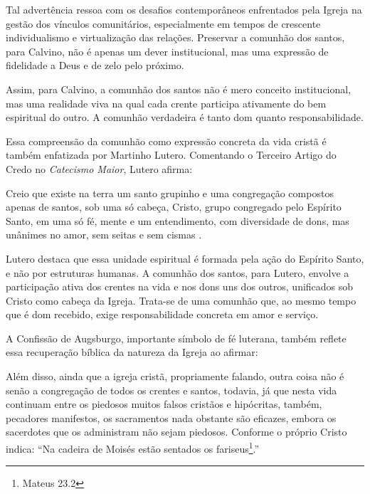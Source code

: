 Tal advertência ressoa com os desafios contemporâneos enfrentados pela Igreja na gestão dos vínculos comunitários, especialmente em tempos de crescente individualismo e virtualização das relações. Preservar a comunhão dos santos, para Calvino, não é apenas um dever institucional, mas uma expressão de fidelidade a Deus e de zelo pelo próximo.

Assim, para Calvino, a comunhão dos santos não é mero conceito institucional, mas uma realidade viva na qual cada crente participa ativamente do bem espiritual do outro. A comunhão verdadeira é tanto dom quanto responsabilidade.

Essa compreensão da comunhão como expressão concreta da vida cristã é também enfatizada por Martinho Lutero. Comentando o Terceiro Artigo do Credo no \textit{Catecismo Maior}, Lutero afirma:

\begin{citacao}
    Creio que existe na terra um santo grupinho e uma congregação compostos apenas de santos, sob uma só cabeça, Cristo, grupo congregado pelo Espírito Santo, em uma só fé, mente e um entendimento, com diversidade de dons, mas unânimes no amor, sem seitas e sem cismas \cite[p.~454]{livroConcordia}.
\end{citacao}

Lutero destaca que essa unidade espiritual é formada pela ação do Espírito Santo, e não por estruturas humanas. A comunhão dos santos, para Lutero, envolve a participação ativa dos crentes na vida e nos dons uns dos outros, unificados sob Cristo como cabeça da Igreja. Trata-se de uma comunhão que, ao mesmo tempo que é dom recebido, exige responsabilidade concreta em amor e serviço.

A Confissão de Augsburgo, importante símbolo de fé luterana, também reflete essa recuperação bíblica da natureza da Igreja ao afirmar:

\begin{citacao}
    Além disso, ainda que a igreja cristã, propriamente falando, outra coisa não é senão a congregação de todos os crentes e santos, todavia, já que nesta vida continuam entre os piedosos muitos falsos cristãos e hipócritas, também, pecadores manifestos, os sacramentos nada obstante são eficazes, embora os sacerdotes que os administram não sejam piedosos. Conforme o próprio Cristo indica: ``Na cadeira de Moisés estão sentados os fariseus\footnote{Mateus 23.2}.''\cite[Artigo~VII, p.~32]{livroConcordia}
\end{citacao}

